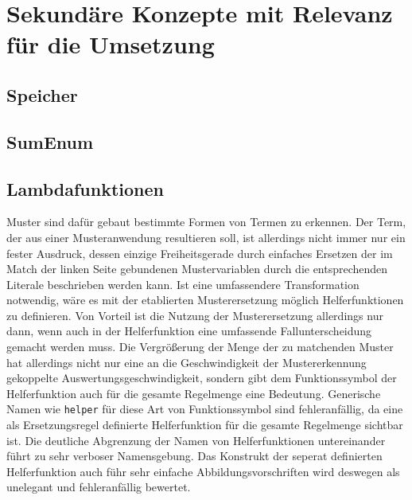 

\section{Sekundäre Konzepte mit Relevanz für die Umsetzung} \label{secHilfUmsetzungInCpp}

\subsection{Speicher} \label{subsecCppSpeicher}

\subsection{SumEnum} \label{subsecCppSumEnum}

\subsection{Lambdafunktionen} \label{subsecLambdafunktionen}
Muster sind dafür gebaut bestimmte Formen von Termen zu erkennen. Der Term, der aus einer Musteranwendung resultieren soll, ist allerdings nicht immer nur ein fester Ausdruck, dessen einzige Freiheitsgerade durch einfaches Ersetzen der im Match der linken Seite gebundenen Mustervariablen durch die entsprechenden Literale beschrieben werden kann. Ist eine umfassendere Transformation notwendig, wäre es mit der etablierten Musterersetzung möglich Helferfunktionen zu definieren. Von Vorteil ist die Nutzung der Musterersetzung allerdings nur dann, wenn auch in der Helferfunktion eine umfassende Fallunterscheidung gemacht werden muss. Die Vergrößerung der Menge der zu matchenden Muster hat allerdings nicht nur eine an die Geschwindigkeit der Mustererkennung gekoppelte Auswertungsgeschwindigkeit,  sondern gibt dem Funktionssymbol der Helferfunktion auch für die gesamte Regelmenge eine Bedeutung. 
Generische Namen wie \texttt{helper} für diese Art von Funktionssymbol sind fehleranfällig, da eine als Ersetzungsregel definierte Helferfunktion für die gesamte Regelmenge sichtbar ist. Die deutliche Abgrenzung der Namen von Helferfunktionen untereinander führt zu sehr verboser Namensgebung.
Das Konstrukt der seperat definierten Helferfunktion auch führ sehr einfache Abbildungsvorschriften wird deswegen als unelegant und fehleranfällig bewertet. 
